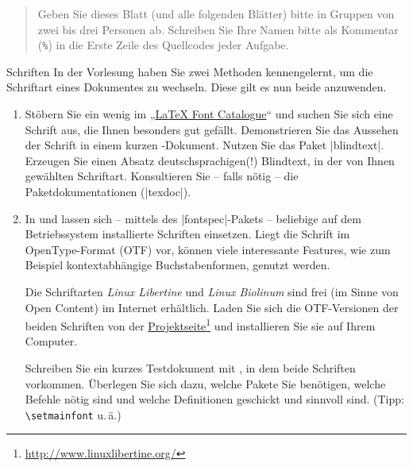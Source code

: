 \documentclass[
	vorläufig, 
	blattnr=1,
	ausgabe=2016-10-28,
	abgabe=2016-11-04,
	shortverb,
]{../tex/latexkurs-exercise}
\begin{document}
\begin{abstract}
	\noindent Geben Sie dieses Blatt (und alle folgenden Blätter) bitte in Gruppen von zwei bis drei Personen ab. Schreiben Sie Ihre Namen bitte als Kommentar (\texttt{\%}) in die Erste Zeile des Quellcodes jeder Aufgabe.
\end{abstract}

\begin{aufgabe}[6]{Schriften}
	In der Vorlesung haben Sie zwei Methoden kennengelernt, um die Schriftart eines Dokumentes zu wechseln.
	Diese gilt es nun beide anzuwenden.
	\begin{enumerate}[label=\alph*)]
		\item Stöbern Sie ein wenig im „\href{http://www.tug.dk/FontCatalogue/}{LaTeX Font Catalogue}“ und suchen Sie sich eine Schrift aus, die Ihnen besonders gut gefällt. Demonstrieren Sie das Aussehen der Schrift in einem kurzen -Dokument. Nutzen Sie das Paket |blindtext|. Erzeugen Sie einen Absatz deutschsprachigen(!) Blindtext, in der von Ihnen gewählten Schriftart. Konsultieren Sie – falls nötig – die Paketdokumentationen (|texdoc|).
		\item In  und  lassen sich – mittels des |fontspec|-Pakets – beliebige auf dem Betriebssystem installierte Schriften einsetzen. Liegt die Schrift im OpenType-Format (OTF) vor, können viele interessante Features, wie zum Beispiel kontextabhängige Buchstabenformen, genutzt werden.
		
		Die Schriftarten \emph{Linux Libertine} und \emph{Linux Biolinum} sind frei (im Sinne von Open Content) im Internet erhältlich. Laden Sie sich die OTF-Versionen der beiden Schriften von der \href{http://www.linuxlibertine.org/index.php?id=91&L=1}{Projektseite}\footnote{\url{http://www.linuxlibertine.org/}} und installieren Sie sie auf Ihrem Computer.
		
		Schreiben Sie ein kurzes Testdokument mit , in dem beide Schriften vorkommen. Überlegen Sie sich dazu, welche Pakete Sie benötigen, welche Befehle nötig sind und welche Definitionen geschickt und sinnvoll sind. (Tipp: \texttt{\textbackslash setmainfont} u.\,ä.)
	\end{enumerate}
\end{aufgabe}

\end{document}
